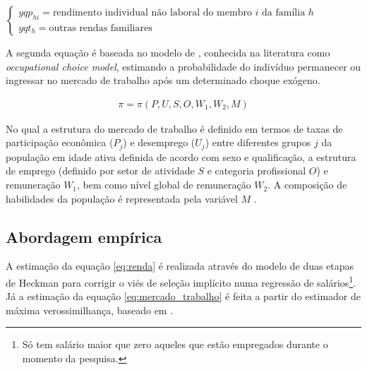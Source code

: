 $
\begin{cases}
	yqp_{hi} = \text{rendimento individual não laboral do membro $i$ da família $h$} \\
	yqt_h    = \text{outras rendas familiares}
\end{cases}
$

\vspace{0.5cm}

A segunda equação é baseada no modelo de \textcite{ganuza02}, conhecida na literatura como \textit{occupational choice model}, estimando a probabilidade do indivíduo permanecer ou ingressar no mercado de trabalho após um determinado choque exógeno.

\begin{align}
	\pi = \pi \left( P, U, S, O, W_1, W_2, M \right) \label{eq:mercado_trabalho}
\end{align}

No qual a estrutura do mercado de trabalho é definido em termos de taxas de participação econômica ($P_j$) e desemprego ($U_j$) entre diferentes grupos $j$ da população em idade ativa definida de acordo com sexo e qualificação, a estrutura de emprego (definido por setor de atividade $S$ e categoria profissional $O$) e remuneração $W_1$, bem como nível global de remuneração $W_2$. A composição de habilidades da população é representada pela variável $M$ \cite{ganuza07}.

\subsection{Abordagem empírica} \label{abordagem_empirica}

A estimação da equação \ref{eq:renda} é realizada através do modelo de duas etapas de Heckman \cite{heckman79} para corrigir o viés de seleção implícito numa regressão de salários\footnote{Só tem salário maior que zero aqueles que estão empregados durante o momento da pesquisa.}. Já a estimação da equação \ref{eq:mercado_trabalho} é feita a partir do estimador de máxima verossimilhança, baseado em \textcite{colombo08}.


